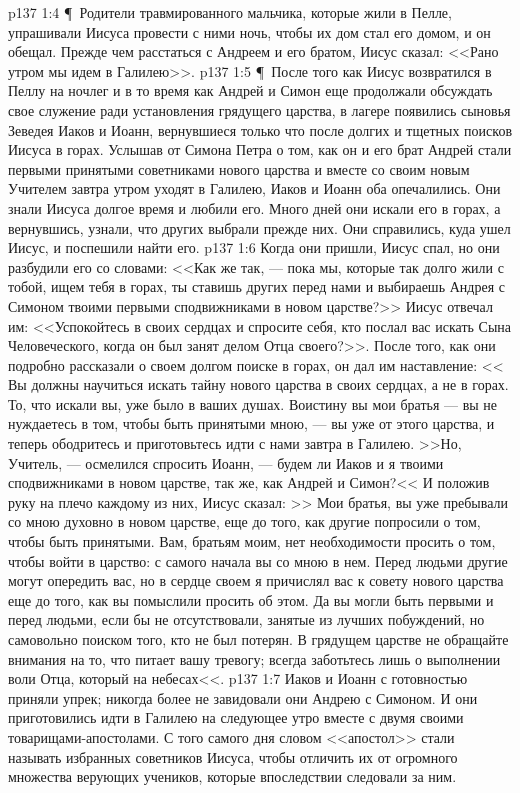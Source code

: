\vs p137 1:4 \P\ Родители травмированного мальчика, которые жили в Пелле, упрашивали Иисуса провести с ними ночь, чтобы их дом стал его домом, и он обещал. Прежде чем расстаться с Андреем и его братом, Иисус сказал: <<Рано утром мы идем в Галилею>>.
\vs p137 1:5 \P\ После того как Иисус возвратился в Пеллу на ночлег и в то время как Андрей и Симон еще продолжали обсуждать свое служение ради установления грядущего царства, в лагере появились сыновья Зеведея Иаков и Иоанн, вернувшиеся только что после долгих и тщетных поисков Иисуса в горах. Услышав от Симона Петра о том, как он и его брат Андрей стали первыми принятыми советниками нового царства и вместе со своим новым Учителем завтра утром уходят в Галилею, Иаков и Иоанн оба опечалились. Они знали Иисуса долгое время и любили его. Много дней они искали его в горах, а вернувшись, узнали, что других выбрали прежде них. Они справились, куда ушел Иисус, и поспешили найти его.
\vs p137 1:6 Когда они пришли, Иисус спал, но они разбудили его со словами: <<Как же так, --- пока мы, которые так долго жили с тобой, ищем тебя в горах, ты ставишь других перед нами и выбираешь Андрея с Симоном твоими первыми сподвижниками в новом царстве?>> Иисус отвечал им: <<Успокойтесь в своих сердцах и спросите себя, кто послал вас искать Сына Человеческого, когда он был занят делом Отца своего?>>. После того, как они подробно рассказали о своем долгом поиске в горах, он дал им наставление: << Вы должны научиться искать тайну нового царства в своих сердцах, а не в горах. То, что искали вы, уже было в ваших душах. Воистину вы мои братья --- вы не нуждаетесь в том, чтобы быть принятыми мною, --- вы уже от этого царства, и теперь ободритесь и приготовьтесь идти с нами завтра в Галилею. >>Но, Учитель, --- осмелился спросить Иоанн, --- будем ли Иаков и я твоими сподвижниками в новом царстве, так же, как Андрей и Симон?<< И положив руку на плечо каждому из них, Иисус сказал: >> Мои братья, вы уже пребывали со мною духовно в новом царстве, еще до того, как другие попросили о том, чтобы быть принятыми. Вам, братьям моим, нет необходимости просить о том, чтобы войти в царство: с самого начала вы со мною в нем. Перед людьми другие могут опередить вас, но в сердце своем я причислял вас к совету нового царства еще до того, как вы помыслили просить об этом. Да вы могли быть первыми и перед людьми, если бы не отсутствовали, занятые из лучших побуждений, но самовольно поиском того, кто не был потерян. В грядущем царстве не обращайте внимания на то, что питает вашу тревогу; всегда заботьтесь лишь о выполнении воли Отца, который на небесах<<.
\vs p137 1:7 Иаков и Иоанн с готовностью приняли упрек; никогда более не завидовали они Андрею с Симоном. И они приготовились идти в Галилею на следующее утро вместе с двумя своими товарищами\hyp{}апостолами. С того самого дня словом <<апостол>> стали называть избранных советников Иисуса, чтобы отличить их от огромного множества верующих учеников, которые впоследствии следовали за ним.
